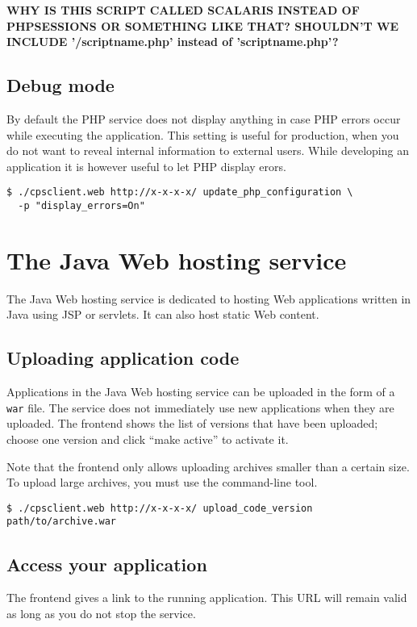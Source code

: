 \documentclass[10pt]{article}
\begin{document}
\textbf{WHY IS THIS SCRIPT CALLED SCALARIS INSTEAD OF PHPSESSIONS OR SOMETHING LIKE THAT? SHOULDN'T WE INCLUDE '/scriptname.php' instead of 'scriptname.php'?}


\subsection{Debug mode}

By default the PHP service does not display anything in case PHP
errors occur while executing the application. This setting is useful
for production, when you do not want to reveal internal information to
external users. While developing an application it is however useful
to let PHP display erors.
\begin{verbatim}
$ ./cpsclient.web http://x-x-x-x/ update_php_configuration \
  -p "display_errors=On" 
\end{verbatim}

\section{The Java Web hosting service}

The Java Web hosting service is dedicated to hosting Web applications
written in Java using JSP or servlets. It can also host static Web
content.

\subsection{Uploading application code}

Applications in the Java Web hosting service can be uploaded in the
form of a \texttt{war} file. The service does not immediately use new
applications when they are uploaded. The frontend shows the list of
versions that have been uploaded; choose one version and click ``make
active'' to activate it.  

Note that the frontend only allows uploading archives smaller than a
certain size.  To upload large archives, you must use the command-line
tool.
\begin{verbatim}
$ ./cpsclient.web http://x-x-x-x/ upload_code_version path/to/archive.war
\end{verbatim}

\subsection{Access your application}

The frontend gives a link to the running application. This URL will
remain valid as long as you do not stop the service.
\end{document}
